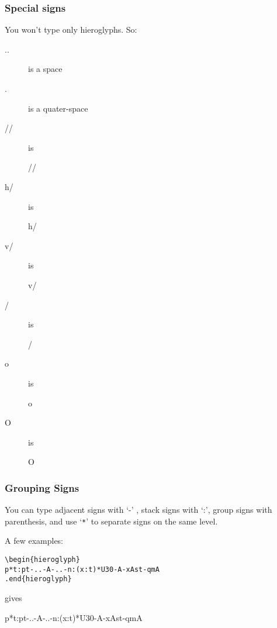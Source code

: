 \documentclass[final]{article}
\begin{document}
\subsubsection{Special signs}
You won't type only hieroglyphs. So: 
\begin{description}
\item[..] is a space
\item[.] is a quater-space
\item[//] is 
  \begin{hieroglyph}
    //
  \end{hieroglyph}

\item[h/] is 
  \begin{hieroglyph}
    h/
  \end{hieroglyph}

\item[v/] is 
  \begin{hieroglyph}
    v/
  \end{hieroglyph}

\item[/] is 
  \begin{hieroglyph}
    /
  \end{hieroglyph}


\item[o] is 
  \begin{hieroglyph}
    o
  \end{hieroglyph}

\item[O] is 
  \begin{hieroglyph}
    O
  \end{hieroglyph}

\end{description}

\subsubsection{Grouping Signs}

You can type adjacent signs with `-' , stack signs with `:', group
signs with parenthesis, and use `\verb.*.' to separate signs on the
same level. 

A few examples: 
\begin{flushleft}
  \verb.\.\verb/begin{hieroglyph}/\\
  \verb/p*t:pt-..-A-..-n:(x:t)*U30-A-xAst-qmA/\\
  \verb/./\verb/end{hieroglyph}/\\
\end{flushleft}
gives 
\begin{hieroglyph}
  p*t:pt-..-A-..-n:(x:t)*U30-A-xAst-qmA
\end{hieroglyph}
\end{document}
